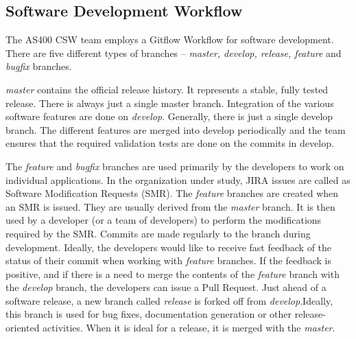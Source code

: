 \documentclass[12pt, a4paper, titlepage]{scrartcl}
\newcommand{\courierword}[1]{\textsf{\itshape #1}}{\fontfamily{pcr}\selectfont}%
\begin{document}
\subsection{Software Development Workflow}
The AS400 CSW team employs a Gitflow Workflow\cite{GitflowWorkflow} for software development. There are five different types of branches – \courierword{master, develop, release, feature} and \courierword{bugfix} branches. 
\par \courierword{master} contains the official release history. It represents a stable, fully tested release. There is always just a single master branch. Integration of the various software features are done on \courierword{develop}. Generally, there is just a single develop branch. The different features are merged into develop periodically and the team ensures that the required validation tests are done on the commits in develop. 
\par The \courierword{feature} and \courierword{bugfix} branches are used primarily by the developers to work on individual applications. In the organization under study, JIRA issues are called as Software Modification Requests (SMR). The \courierword{feature} branches are created when an SMR is issued. They are usually derived from the \courierword{master} branch.  It is then used by a developer (or a team of developers) to perform the modifications required by the SMR. Commits are made regularly to the branch during development. Ideally, the developers would like to receive fast feedback of the status of their commit when working with \courierword{feature} branches. If the feedback is positive, and if there is a need to merge the contents of the \courierword{feature} branch with the \courierword{develop} branch, the developers can issue a Pull Request\cite{dabbish2012social}. Just ahead of a software release, a new branch called \courierword{release} is forked off from \courierword{develop}.Ideally, this branch is used for bug fixes, documentation generation or other release-oriented activities. When it is ideal for a release, it is merged with the \courierword{master}. 
\end{document}
